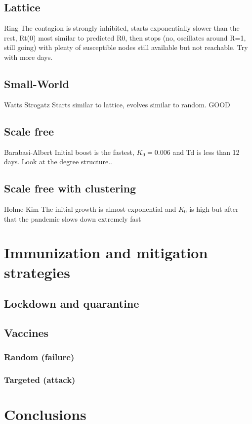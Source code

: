 \documentclass[DIV=12, BCOR=0pt]{scrartcl}  %
\begin{document}
  
  \subsection{Lattice}
  Ring
  The contagion is strongly inhibited, starts exponentially slower than the rest, Rt(0) most similar to predicted R0,
  then stops (no, oscillates around R=1, still going) with plenty of susceptible nodes still available but not reachable. Try with more days.
  
  
  \subsection{Small-World}
  Watts Strogatz
  Starts similar to lattice, evolves similar to random. GOOD
  
  \subsection{Scale free}
  Barabasi-Albert
  Initial boost is the fastest, $K_{0}=0.006$ and Td is less than 12 days. Look at the degree structure..
  
  
  \subsection{Scale free with clustering}
  Holme-Kim
  The initial growth is almost exponential and $K_{0}$ is high but after that the pandemic slows down extremely fast
  
  
  
  
  
  
  \section{Immunization and mitigation strategies}
  \subsection{Lockdown and quarantine}
  \subsection{Vaccines}
  \subsubsection{Random (failure)}
	\subsubsection{Targeted (attack)}

	\section{Conclusions}

		
  \footnotesize
	
\end{document}
